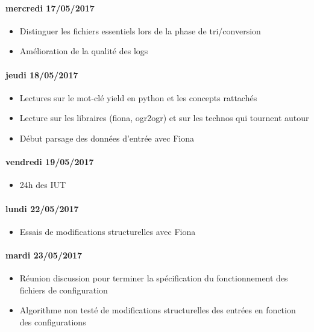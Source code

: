 \paragraph{mercredi 17/05/2017}
\begin{itemize}
  \item Distinguer les fichiers essentiels lors de la phase de tri/conversion
  \item Amélioration de la qualité des logs
\end{itemize}

\paragraph{jeudi 18/05/2017}
\begin{itemize}
  \item Lectures sur le mot-clé yield en python et les concepts rattachés
  \item Lecture sur les libraires (fiona, ogr2ogr) et sur les technos qui tournent autour
  \item Début parsage des données d'entrée avec Fiona
\end{itemize}

\paragraph{vendredi 19/05/2017}
\begin{itemize}
  \item 24h des IUT
\end{itemize}

\paragraph{lundi 22/05/2017}
\begin{itemize}
  \item Essais de modifications structurelles avec Fiona
\end{itemize}

\paragraph{mardi 23/05/2017}
\begin{itemize}
  \item Réunion discussion pour terminer la spécification du fonctionnement des fichiers de configuration
  \item Algorithme non testé de modifications structurelles des entrées en fonction des configurations
\end{itemize}

